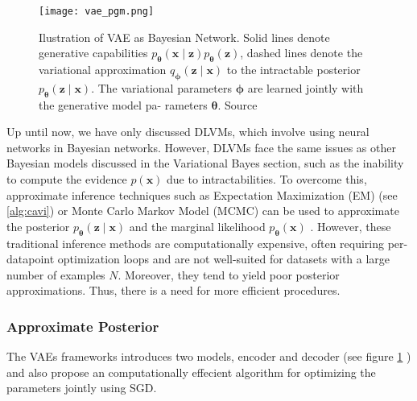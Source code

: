 \begin{figure}[tb]
    \centering
    \texttt{[image: vae\_pgm.png]}
    \caption[VAE as Bayesian network]{Ilustration of VAE as Bayesian Network. Solid lines denote generative capabilities 
    $p_{\boldsymbol{\theta}}(\mathbf{x}\mid \mathbf{z})p_{\boldsymbol{\theta}}(\mathbf{z})$, dashed lines denote the variational approximation $q_{\boldsymbol{\phi}}(\mathbf{z}\mid \mathbf{x})$
    to the intractable posterior $p_{\boldsymbol{\theta}}(\mathbf{z}\mid \mathbf{x})$. The variational parameters ${\boldsymbol{\phi}}$ are learned jointly with the generative model pa-
    rameters ${\boldsymbol{\theta}}$. Source \cite{vae-original-2013}}
    \label{fig:vae_pgm}
\end{figure}

Up until now, we have only discussed DLVMs, which involve using neural networks in Bayesian networks. However, DLVMs face the same issues as 
other Bayesian models discussed in the Variational Bayes section, such as the inability to compute the evidence $p(\mathbf{x})$ due to 
intractabilities. To overcome this, approximate inference techniques such as Expectation Maximization (EM) (see \ref{alg:cavi}) or 
Monte Carlo Markov Model (MCMC)  can be used to approximate the posterior $p_{\boldsymbol{\theta}}(\mathbf{z}\mid \mathbf{x})$ and the marginal 
likelihood $p_{\boldsymbol{\theta}}(\mathbf{x})$ \cite[appx.~A2]{intro-vae-2019}.  However, these traditional inference methods are computationally expensive,
often requiring per-datapoint optimization loops and are not well-suited for datasets with a large number of examples $N$. Moreover, they tend
to yield poor posterior approximations. Thus, there is a need for more efficient procedures.

\subsubsection{Approximate Posterior}
\label{subsubsec:vae_encoder}
The VAEs frameworks introduces two models, encoder and decoder (see figure \ref{fig:vae_pgm} ) and also propose an computationally effecient algorithm for optimizing the parameters jointly
using SGD.

